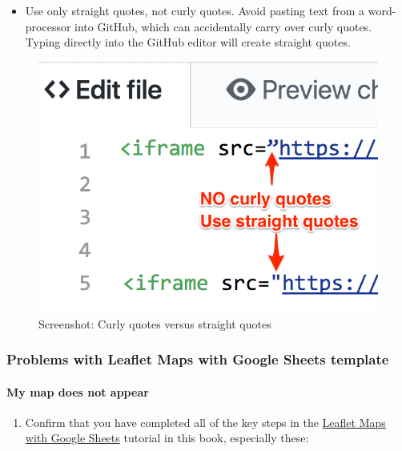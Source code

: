 \documentclass[
  english,
]{book}
\providecommand{\tightlist}{%
  \setlength{\itemsep}{0pt}\setlength{\parskip}{0pt}}
\begin{document}
\begin{itemize}
\tightlist
\item
  Use only straight quotes, not curly quotes. Avoid pasting text from a word-processor into GitHub, which can accidentally carry over curly quotes. Typing directly into the GitHub editor will create straight quotes.
\end{itemize}

\begin{figure}
\centering
\includegraphics{images/08-github/curly-vs-straight-quotes.png}
\caption{Screenshot: Curly quotes versus straight quotes}
\end{figure}

\hypertarget{problems-with-leaflet-maps-with-google-sheets-template}{%
\subsubsection*{Problems with Leaflet Maps with Google Sheets template}\label{problems-with-leaflet-maps-with-google-sheets-template}}

\hypertarget{my-map-does-not-appear}{%
\paragraph{My map does not appear}\label{my-map-does-not-appear}}

\begin{enumerate}
\def\labelenumi{\arabic{enumi})}
\tightlist
\item
  Confirm that you have completed all of the key steps in the \href{leaflet-with-google-sheets}{Leaflet Maps with Google Sheets} tutorial in this book, especially these:
\end{enumerate}
\end{document}
